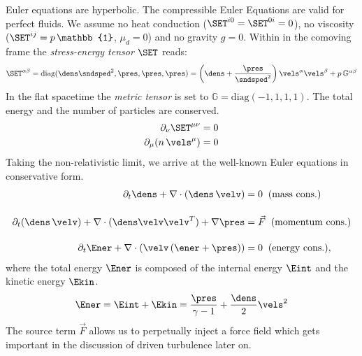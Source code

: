 Euler equations are hyperbolic.
The compressible Euler Equations are valid for perfect fluids.  We assume no
heat conduction ($\SET^{i0} = \SET^{0i} = 0$), no viscosity ($\SET^{ij} =
p\,\mathbb{1}$, $\mu_d = 0$) and no gravity $g = 0$. Within in the comoving frame the
\emph{stress-energy tensor} $\SET$ reads:
\begin{equation}
\SET^{\alpha\beta} = \text{diag}(\dens\sndsped^2,\pres,\pres,\pres) = \left(\dens + \frac{\pres}{\sndsped^2}\right) \vels^\alpha\vels^\beta + p\,\mathbb{G}^{\alpha\beta}
\end{equation}
In the flat spacetime the \emph{metric tensor} is set to $\mathbb{G} = \text{diag}(-1,1,1,1)$. The total energy
and the number of particles are conserved.
\begin{align}
\partial_\nu \SET^{\mu\nu}  &= 0\\
\partial_\mu (n\,\vels^\mu) &= 0
\end{align}
Taking the non-relativistic limit, we arrive at the well-known Euler equations in conservative
form.
\begin{align}
\label{eq:comp-euler}
\partial_t\dens + \nabla \cdot (\dens\,\velv)   &=  0 \;\;\text{(mass cons.)}\\[0.4cm]
\partial_t(\dens\,\velv) + \nabla\cdot(\dens\velv\velv^T) + \nabla \pres &= \vec{F}  \;\;\text{(momentum cons.)}\\[0.4cm]
\partial_t \Ener + \nabla \cdot (\velv\,(\ener + \pres)) &=  0\;\;\text{(energy cons.)},
\end{align}
where the total energy $\Ener$ is composed of the internal energy $\Eint$ and
the kinetic energy $\Ekin$.
\begin{equation}
\Ener = \Eint + \Ekin = \frac{\pres}{\gamma -1} + \frac{\dens}{2}\vels^2
\end{equation}
The source term $\vec{F}$ allows us to perpetually inject a force field which gets important in the
discussion of driven turbulence later on.

